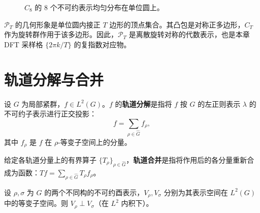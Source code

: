 \begin{figure}[htbp]
    \centering
    \caption{$C_8$ 的 8 个不可约表示均匀分布在单位圆上。}
    \label{fig:PPO_C8}
\end{figure}

\begin{remark}\label{rem:unit_root_geometry}
$\mathcal{P}_T$ 的几何形象是单位圆内接正 $T$ 边形的顶点集合。其凸包是对称正多边形，$C_T$ 作为旋转群作用于该多边形。因此，$\mathcal{P}_T$ 是离散旋转对称的代数表示，也是本章 DFT 采样格 $\{2\pi k/T\}$ 的复指数对应物。
\end{remark}

\section{\texorpdfstring{轨道分解与合并}{轨道分解与合并}}\label{sec:orbit_decomposition_synthesis}

\begin{definition}[轨道分解]\label{def:orbit_decomposition}
设 $G$ 为局部紧群，$f \in L^2(G)$。$f$ 的\textbf{轨道分解}是指将 $f$ 按 $G$ 的左正则表示 $\lambda$ 的不可约子表示进行正交投影：
\[f = \sum_{\rho \in \widehat{G}} f_\rho,\]
其中 $f_\rho$ 是 $f$ 在 $\rho$-等变子空间上的分量。
\end{definition}

\begin{definition}[轨道合并]\label{def:orbit_synthesis}
给定各轨道分量上的有界算子 $\{T_\rho\}_{\rho \in \widehat{G}}$，\textbf{轨道合并}是指将作用后的各分量重新合成为函数：$T f = \sum_{\rho \in \widehat{G}} T_\rho f_\rho$。
\end{definition}

\begin{lemma}[不可约子空间的正交性]\label{lem:irreducible_orthogonality}
设 $\rho, \sigma$ 为 $G$ 的两个不同构的不可约酉表示，$V_\rho, V_\sigma$ 分别为其表示空间在 $L^2(G)$ 中的等变子空间。则 $V_\rho \perp V_\sigma$（在 $L^2$ 内积下）。
\end{lemma}

